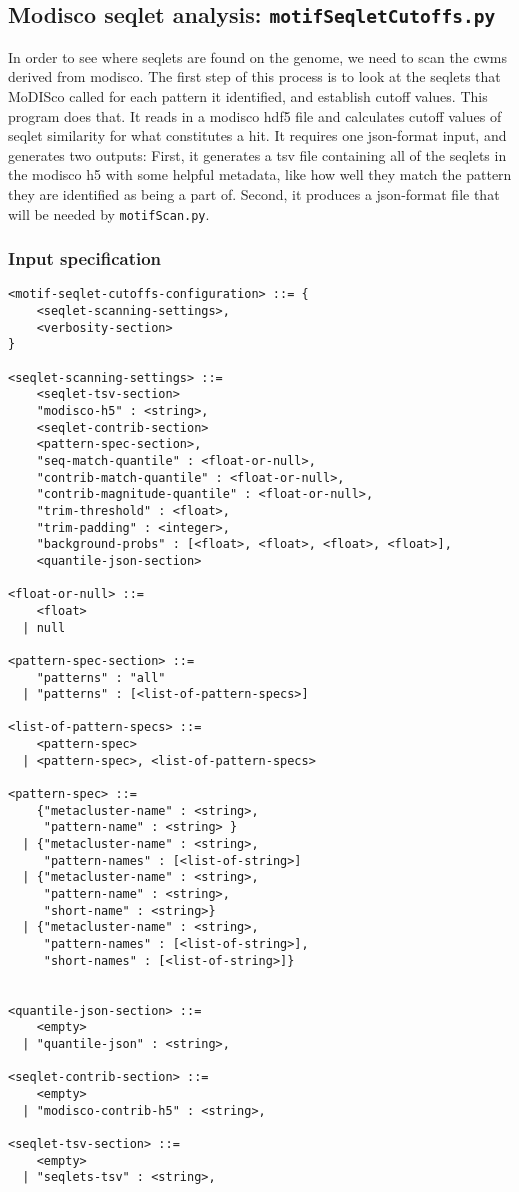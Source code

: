 \documentclass{article}
\begin{document}
\subsection{Modisco seqlet analysis: \texttt{motifSeqletCutoffs.py}}
In order to see where seqlets are found on the genome, we need to scan the cwms derived from modisco.
The first step of this process is to look at the seqlets that MoDISco called for each pattern
it identified, and establish cutoff values.
This program does that. 
It reads in a modisco hdf5 file and calculates cutoff values of seqlet similarity for
what constitutes a hit.
It requires one json-format input, and generates two outputs: First, it generates a tsv
file containing all of the seqlets in the modisco h5 with some helpful metadata,
like how well they match the pattern they are identified as being a part of.
Second, it produces a json-format file that will be needed by \texttt{motifScan.py}.

\subsubsection{Input specification}
\begin{lstlisting}
<motif-seqlet-cutoffs-configuration> ::= {
    <seqlet-scanning-settings>,
    <verbosity-section>
}

<seqlet-scanning-settings> ::=
    <seqlet-tsv-section>
    "modisco-h5" : <string>,
    <seqlet-contrib-section>
    <pattern-spec-section>,
    "seq-match-quantile" : <float-or-null>,
    "contrib-match-quantile" : <float-or-null>,
    "contrib-magnitude-quantile" : <float-or-null>,
    "trim-threshold" : <float>,
    "trim-padding" : <integer>,
    "background-probs" : [<float>, <float>, <float>, <float>],
    <quantile-json-section>

<float-or-null> ::=
    <float>
  | null

<pattern-spec-section> ::=
    "patterns" : "all"
  | "patterns" : [<list-of-pattern-specs>]

<list-of-pattern-specs> ::=
    <pattern-spec>
  | <pattern-spec>, <list-of-pattern-specs>

<pattern-spec> ::= 
    {"metacluster-name" : <string>,
     "pattern-name" : <string> }
  | {"metacluster-name" : <string>,
     "pattern-names" : [<list-of-string>]
  | {"metacluster-name" : <string>,
     "pattern-name" : <string>,
     "short-name" : <string>}
  | {"metacluster-name" : <string>,
     "pattern-names" : [<list-of-string>],
     "short-names" : [<list-of-string>]}


<quantile-json-section> ::=
    <empty>
  | "quantile-json" : <string>,

<seqlet-contrib-section> ::=
    <empty>
  | "modisco-contrib-h5" : <string>,

<seqlet-tsv-section> ::=
    <empty>
  | "seqlets-tsv" : <string>,
\end{lstlisting}
\end{document}
